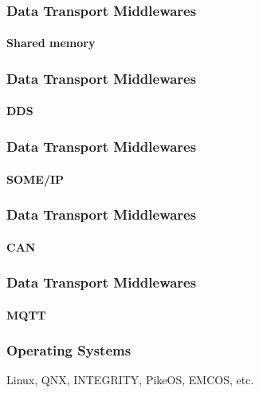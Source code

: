 \begin{frame}
\frametitle{Data Transport Middlewares}
\framesubtitle{Shared memory}
\end{frame}

\begin{frame}
\frametitle{Data Transport Middlewares}
\framesubtitle{DDS}
\end{frame}

\begin{frame}
\frametitle{Data Transport Middlewares}
\framesubtitle{SOME/IP}
\end{frame}

\begin{frame}
\frametitle{Data Transport Middlewares}
\framesubtitle{CAN}
\end{frame}

\begin{frame}
\frametitle{Data Transport Middlewares}
\framesubtitle{MQTT}
\end{frame}

\begin{frame}
\frametitle{Operating Systems}
Linux, QNX, INTEGRITY, PikeOS, EMCOS, etc. 
\end{frame}